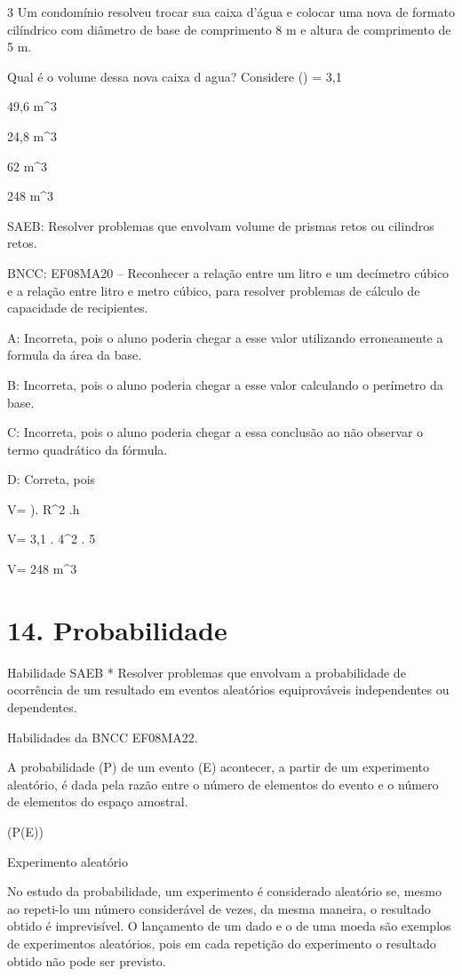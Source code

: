 {\num{3} Um condomínio resolveu trocar sua caixa d'água e colocar uma nova de
formato cilíndrico com diâmetro de base de comprimento 8 m e altura de
comprimento de 5 m.

Qual é o volume dessa nova caixa d agua? Considere () = 3,1
\item 49,6 m^3
\item 24,8 m^3
\item 62 m^3
\item 248 m^3

SAEB: Resolver problemas que envolvam volume de prismas retos ou
cilindros retos.

BNCC: EF08MA20 -- Reconhecer a relação entre um litro e um decímetro
cúbico e a relação entre litro e metro cúbico, para resolver problemas
de cálculo de capacidade de recipientes.

A: Incorreta, pois o aluno poderia chegar a esse valor utilizando
erroneamente a formula da área da base.

B: Incorreta, pois o aluno poderia chegar a esse valor calculando o
perímetro da base.

C: Incorreta, pois o aluno poderia chegar a essa conclusão ao não
observar o termo quadrático da fórmula.

D: Correta, pois

V= \Pi). R^2 .h

V= 3,1 . 4^2 . 5

V= 248 m^3


\section{14. Probabilidade}

Habilidade SAEB * Resolver problemas que envolvam a probabilidade de
ocorrência de um resultado em eventos aleatórios equiprováveis
independentes ou dependentes.

Habilidades da BNCC EF08MA22.

A probabilidade (P) de um evento (E) acontecer, a partir de um
experimento aleatório, é dada pela razão entre o número de elementos do
evento e o número de elementos do espaço amostral.

(P(E))

Experimento aleatório

No estudo da probabilidade, um experimento é considerado aleatório se,
mesmo ao repeti-lo um número considerável de vezes, da mesma maneira, o
resultado obtido é imprevisível. O lançamento de um dado e o de uma
moeda são exemplos de experimentos aleatórios, pois em cada repetição do
experimento o resultado obtido não pode ser previsto.

}

